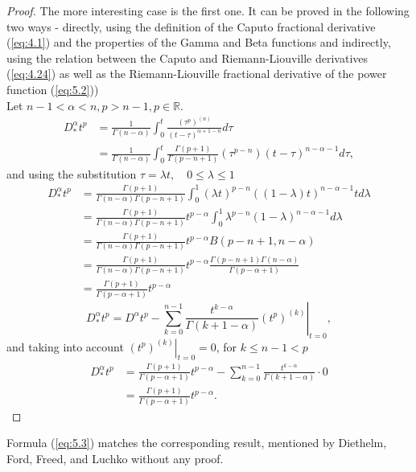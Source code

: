 \documentclass[a4paper,14pt,oneside]{book}
\theoremstyle{plain}
\theoremstyle{definition}
\theoremstyle{remark}
\begin{document}
\begin{center}
\begin{flushleft}
{\begin{proof}
The more interesting case is the first one. It can be proved in the following two ways - directly, using the definition of the Caputo fractional derivative (\ref{eq:4.1}) and the properties of the Gamma and Beta functions and indirectly, using the relation between the Caputo and Riemann-Liouville derivatives (\ref{eq:4.24}) as well as the Riemann-Liouville fractional derivative of the power function (\ref{eq:5.2}))\\
Let $n-1<\alpha<n, p>n-1, p \in \mathbb{R}$.\\
\textbullet {}
$$
\begin{aligned}
D_{*}^{\alpha} t^{p} &=\frac{1}{\Gamma(n-\alpha)} \int_{0}^{t} \frac{\left(\tau^{p}\right)^{(n)}}{(t-\tau)^{\alpha+1-n}} d \tau \\
&=\frac{1}{\Gamma(n-\alpha)} \int_{0}^{t} \frac{\Gamma(p+1)}{\Gamma(p-n+1)}\left(\tau^{p-n}\right)(t-\tau)^{n-\alpha-1} d \tau,
\end{aligned}
$$
and using the substitution $\tau=\lambda t, \quad 0 \leq \lambda \leq 1$
$$
\begin{aligned}
D_{*}^{\alpha} t^{p} &=\frac{\Gamma(p+1)}{\Gamma(n-\alpha) \Gamma(p-n+1)} \int_{0}^{1}(\lambda t)^{p-n}((1-\lambda) t)^{n-\alpha-1} t d \lambda \\
&=\frac{\Gamma(p+1)}{\Gamma(n-\alpha) \Gamma(p-n+1)} t^{p-\alpha} \int_{0}^{1} \lambda^{p-n}(1-\lambda)^{n-\alpha-1} d \lambda \\
&=\frac{\Gamma(p+1)}{\Gamma(n-\alpha) \Gamma(p-n+1)} t^{p-\alpha} B(p-n+1, n-\alpha) \\
&=\frac{\Gamma(p+1)}{\Gamma(n-\alpha) \Gamma(p-n+1)} t^{p-\alpha} \frac{\Gamma(p-n+1) \Gamma(n-\alpha)}{\Gamma(p-\alpha+1)} \\
&=\frac{\Gamma(p+1)}{\Gamma(p-\alpha+1)} t^{p-\alpha}
\end{aligned}
$$
\textbullet {}
$$
D_{*}^{\alpha} t^{p}=D^{\alpha} t^{p}-\left.\sum_{k=0}^{n-1} \frac{t^{k-\alpha}}{\Gamma(k+1-\alpha)}\left(t^{p}\right)^{(k)}\right|_{t=0},
$$
and taking into account $\left.\left(t^{p}\right)^{(k)}\right|_{t=0}=0$, for $k \leq n-1<p$
$$
\begin{aligned}
D_{*}^{\alpha} t^{p} &=\frac{\Gamma(p+1)}{\Gamma(p-\alpha+1)} t^{p-\alpha}-\sum_{k=0}^{n-1} \frac{t^{k-\alpha}}{\Gamma(k+1-\alpha)} \cdot 0 \\
&=\frac{\Gamma(p+1)}{\Gamma(p-\alpha+1)} t^{p-\alpha} .
\end{aligned}
$$
\end{proof}
Formula (\ref{eq:5.3}) matches the corresponding result, mentioned by Diethelm, Ford, Freed, and Luchko \cite{bb15} without any proof.
}
\end{flushleft}
\end{center}
\end{document}
